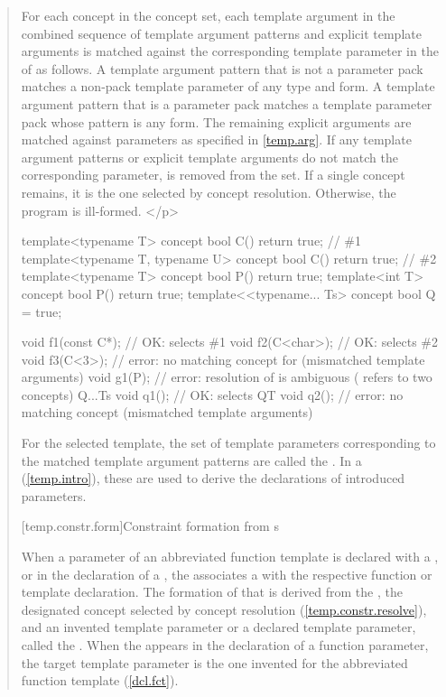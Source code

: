 \begin{quote}
\pnum
For each concept  in the concept set, each template 
argument in the combined sequence of template argument patterns and explicit 
template arguments is matched against the corresponding template parameter
in the  of 
 as follows.
% 
A template argument pattern that is not a parameter pack matches a 
non-pack template parameter of any type and form. A template argument 
pattern that is a parameter pack matches a template parameter pack
whose pattern is any form.
% 
The remaining explicit arguments are matched against parameters
as specified in \ref{temp.arg}.
% 
If any template argument patterns or explicit template arguments do not 
match the corresponding parameter,  is removed from the set.
% 
If a single concept remains, it is the one selected by concept 
resolution. Otherwise, the program is ill-formed. </p>
% 
\enterexample
\begin{codeblock}
template<typename T> concept bool C() { return true; }             // \#1
template<typename T, typename U> concept bool C() { return true; } // \#2
template<typename T> concept bool P() { return true; }
template<int T> concept bool P() { return true; }
template<<typename... Ts> concept bool Q = true;

void f1(const C*);  // OK:  selects \#1
void f2(C<char>);   // OK:  selects \#2
void f3(C<3>);      // error: no matching concept for  (mismatched template arguments)
void g1(P);         // error: resolution of  is ambiguous ( refers to two concepts)
Q{...Ts} void q1(); // OK: selects 
Q{T} void q2();     // error: no matching concept (mismatched template arguments)
\end{codeblock}
\exitexample

\pnum
For the selected template, the set of template parameters corresponding
to the matched template argument patterns are called the
. 
% 
In a  (\ref{temp.intro}), these
are used to derive the declarations of introduced parameters.


[temp.constr.form]{Constraint formation from s}

\pnum
When a parameter of an abbreviated function template is declared
with a ,
or in the declaration of a 
,
the 
associates a 
with the respective function or template declaration.
% 
The formation of that 
is derived from the ,
the designated concept selected by concept resolution 
(\ref{temp.constr.resolve}), and an 
invented template parameter or a declared template parameter, called
the .
% 
When the 
appears in the declaration of a function parameter, the target template
parameter is the one invented for the abbreviated function template
(\ref{dcl.fct}).


\end{quote}
